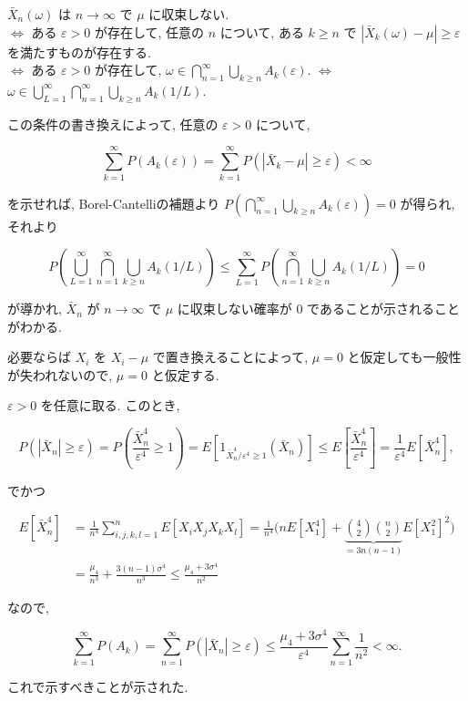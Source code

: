 \documentclass[10pt, a4paper,xelatex,ja=standard]{bxjsarticle}
\newcommand\eps{\varepsilon}
\begin{document}
\(\bar{X}_n(\omega)\) は \(n\to\infty\) で \(\mu\) に収束しない. \\
\(\iff\) ある \(\eps>0\) が存在して, 任意の \(n\) について, ある
\(k\ge n\) で \(|\bar{X}_k(\omega)-\mu|\ge\eps\) を満たすものが存在する. \\
\(\iff\) ある \(\eps>0\) が存在して, \(\displaystyle
\omega \in \bigcap_{n=1}^\infty \bigcup_{k\ge n}
A_k(\eps) \). \(\iff\) \(\displaystyle
\omega \in \bigcup_{L=1}^\infty \bigcap_{n=1}^\infty \bigcup_{k\ge n}
A_k(1/L) \).

この条件の書き換えによって, 任意の \(\eps>0\) について,

\[
\sum_{k=1}^\infty P(A_k(\eps)) = \sum_{k=1}^\infty P(|\bar{X}_k-\mu|\ge\eps) < \infty
\]

を示せれば, Borel-Cantelliの補題より
\(P\left(\bigcap_{n=1}^\infty \bigcup_{k\ge n} A_k(\eps)\right) = 0\)
が得られ, それより

\[
P\left(\bigcup_{L=1}^\infty \bigcap_{n=1}^\infty \bigcup_{k\ge n} A_k(1/L)\right)
\le \sum_{L=1}^\infty P\left(\bigcap_{n=1}^\infty \bigcup_{k\ge n} A_k(1/L)\right)
=0
\]

が導かれ, \(\bar{X}_n\) が \(n\to\infty\) で \(\mu\) に収束しない確率が
\(0\) であることが示されることがわかる.

必要ならば \(X_i\) を \(X_i-\mu\) で置き換えることによって, \(\mu=0\)
と仮定しても一般性が失われないので, \(\mu=0\) と仮定する.

\(\eps>0\) を任意に取る. このとき,

\[
P(|\bar{X}_n|\ge\eps) =
P\left(\frac{\bar{X}_n^4}{\eps^4}\ge 1\right) =
E\left[1_{\bar{X}_n^4/\eps^4\ge 1}(\bar{X}_n)\right] \le
E\left[\frac{\bar{X}_n^4}{\eps^4}\right] =
\frac{1}{\eps^4}E\left[\bar{X}_n^4\right],
\]

でかつ

\[
\begin{aligned}
E\left[\bar{X}_n^4\right] &=
\frac{1}{n^4}\sum_{i,j,k,l=1}^n E[X_i X_j X_k X_l] =
\frac{1}{n^4}\biggl(
n E[X_1^4] + \underbrace{\binom{4}{2}\binom{n}{2}}_{=3n(n-1)} E[X_1^2]^2
\biggr)
\\ &=
\frac{\mu_4}{n^3} + \frac{3(n-1)\sigma^4}{n^3} \le
\frac{\mu_4 + 3\sigma^4}{n^2}
\end{aligned}
\]

なので,

\[
\sum_{k=1}^\infty P(A_k) =
\sum_{n=1}^\infty P(|\bar{X}_n|\ge\eps) \le
\frac{\mu_4 + 3\sigma^4}{\eps^4}\sum_{n=1}^\infty \frac{1}{n^2} < \infty.
\]

これで示すべきことが示された.
\end{document}

